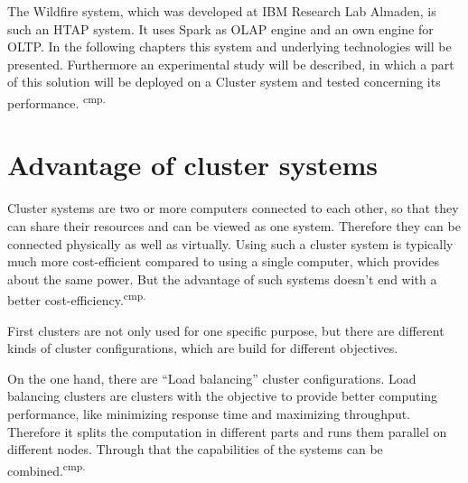 The Wildfire system, which was developed at IBM Research Lab Almaden, is such an HTAP system. It uses Spark as OLAP engine and an own engine for OLTP. In the following chapters this system and underlying technologies will be presented. Furthermore an experimental study will be described, in which a part of this solution will be deployed on a Cluster system and tested concerning its performance. \textsuperscript{cmp.\cite{7}}


\section{Advantage of cluster systems}

Cluster systems are two or more computers connected to each other, so that they can share their resources and can be viewed as one system. Therefore they can be connected physically as well as virtually. Using such a cluster system is typically much more cost-efficient compared to using a single computer, which provides about the same power. But the advantage of such systems doesn't end with a better cost-efficiency.\textsuperscript{cmp.\cite{1}}


First clusters are not only used for one specific purpose, but there are different kinds of cluster configurations, which are build for different objectives.

On the one hand, there are ``Load balancing'' cluster configurations. Load balancing clusters are clusters with the objective to provide better computing performance, like minimizing response time and maximizing throughput.  Therefore it splits the computation in different parts and runs them parallel on different nodes. Through that the capabilities of the systems can be combined.\textsuperscript{cmp.\cite{2}}


